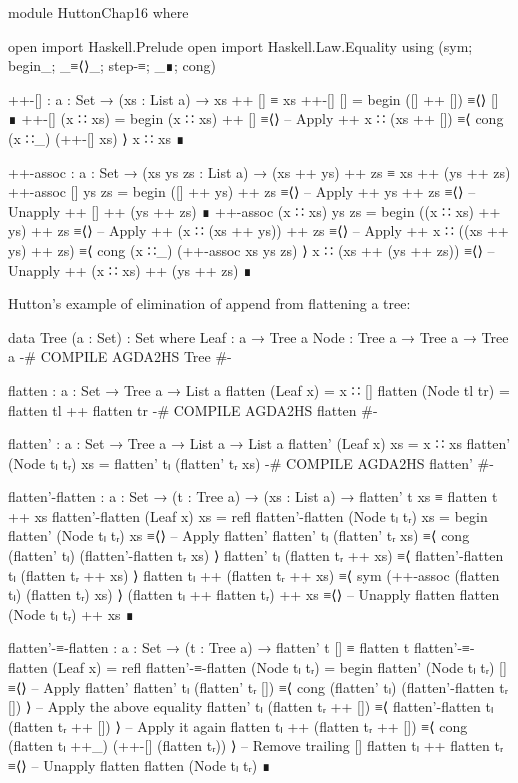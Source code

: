 \documentclass{article}
\begin{document}
\begin{code}
module HuttonChap16 where

open import Haskell.Prelude
open import Haskell.Law.Equality using (sym; begin_; _≡⟨⟩_; step-≡; _∎; cong)

++-[] : {a : Set} → (xs : List a) → xs ++ [] ≡ xs
++-[] [] = begin ([] ++ []) ≡⟨⟩ [] ∎
++-[] (x ∷ xs) =
    begin
      (x ∷ xs) ++ []
    ≡⟨⟩ -- Apply ++
      x ∷ (xs ++ [])
    ≡⟨ cong (x ∷_) (++-[] xs) ⟩
      x ∷ xs
    ∎

++-assoc : {a : Set} → (xs ys zs : List a)
    → (xs ++ ys) ++ zs ≡ xs ++ (ys ++ zs)
++-assoc [] ys zs =
    begin
      ([] ++ ys) ++ zs
    ≡⟨⟩ -- Apply ++
      ys ++ zs
    ≡⟨⟩ -- Unapply ++
      [] ++ (ys ++ zs)
    ∎
++-assoc (x ∷ xs) ys zs =
    begin
      ((x ∷ xs) ++ ys) ++ zs
    ≡⟨⟩ -- Apply ++
      (x ∷ (xs ++ ys)) ++ zs
    ≡⟨⟩ -- Apply ++
      x ∷ ((xs ++ ys) ++ zs)
    ≡⟨ cong (x ∷_) (++-assoc xs ys zs) ⟩
      x ∷ (xs ++ (ys ++ zs))
    ≡⟨⟩ -- Unapply ++
      (x ∷ xs) ++ (ys ++ zs)
    ∎
\end{code}

\noindent Hutton's example of elimination of append from flattening a tree:

\begin{code}
data Tree (a : Set) : Set where
    Leaf : a → Tree a
    Node : Tree a → Tree a → Tree a
{-# COMPILE AGDA2HS Tree #-}

flatten : {a : Set} → Tree a → List a
flatten (Leaf x) = x ∷ []
flatten (Node tl tr) = flatten tl ++ flatten tr
{-# COMPILE AGDA2HS flatten #-}

flatten' : {a : Set } → Tree a → List a → List a
flatten' (Leaf x) xs = x ∷ xs
flatten' (Node tₗ tᵣ) xs = flatten' tₗ (flatten' tᵣ xs)
{-# COMPILE AGDA2HS flatten' #-}
\end{code}

\begin{code}
flatten'-flatten : {a : Set} → (t : Tree a) → (xs : List a)
    → flatten' t xs ≡ flatten t ++ xs
flatten'-flatten (Leaf x) xs = refl
flatten'-flatten (Node tₗ tᵣ) xs =
  begin
    flatten' (Node tₗ tᵣ) xs
  ≡⟨⟩ -- Apply flatten'
    flatten' tₗ (flatten' tᵣ xs)
  ≡⟨ cong (flatten' tₗ) (flatten'-flatten tᵣ xs) ⟩
    flatten' tₗ (flatten tᵣ ++ xs)
  ≡⟨ flatten'-flatten tₗ (flatten tᵣ ++ xs) ⟩
    flatten tₗ ++ (flatten tᵣ ++ xs)
  ≡⟨ sym (++-assoc (flatten tₗ) (flatten tᵣ) xs) ⟩
    (flatten tₗ ++ flatten tᵣ) ++ xs
  ≡⟨⟩ -- Unapply flatten
    flatten (Node tₗ tᵣ) ++ xs
  ∎

flatten'-≡-flatten : {a : Set} → (t : Tree a)
    → flatten' t [] ≡ flatten t
flatten'-≡-flatten (Leaf x) = refl
flatten'-≡-flatten (Node tₗ tᵣ) =
  begin
    flatten' (Node tₗ tᵣ) []
  ≡⟨⟩ -- Apply flatten'
    flatten' tₗ (flatten' tᵣ [])
  ≡⟨ cong (flatten' tₗ) (flatten'-flatten tᵣ []) ⟩ -- Apply the above equality
    flatten' tₗ (flatten tᵣ ++ [])
  ≡⟨ flatten'-flatten tₗ (flatten tᵣ ++ []) ⟩ -- Apply it again
    flatten tₗ ++ (flatten tᵣ ++ [])
  ≡⟨ cong (flatten tₗ ++_) (++-[] (flatten tᵣ)) ⟩ -- Remove trailing []
    flatten tₗ ++ flatten tᵣ
  ≡⟨⟩ -- Unapply flatten
    flatten (Node tₗ tᵣ)
  ∎
\end{code}
\end{document}
